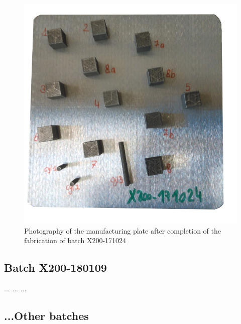 \begin{figure}[ht]
\centering
\includegraphics[scale=0.45]{Images/171024-real}
\decoRule
\caption[Photography of the manufacturing plate after completion of the fabrication of batch X200-171024]{Photography of the manufacturing plate after completion of the fabrication of batch X200-171024}
\label{fig:171024-real}
\end{figure}


\subsection{Batch X200-180109}

... ... ...

\subsection{...Other batches}